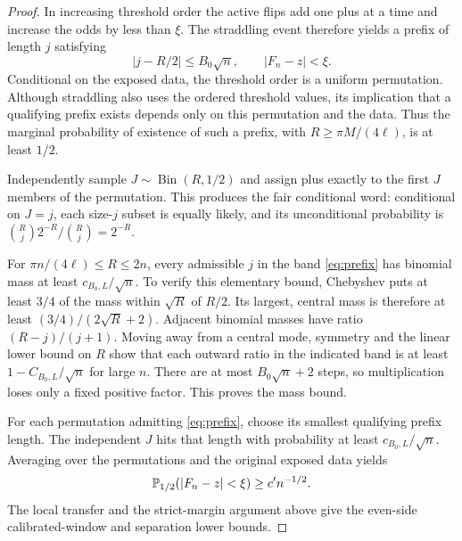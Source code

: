 \begin{proof}
In increasing threshold order the active flips add one plus at a time and increase the odds by less than $\xi$. The straddling event therefore yields a prefix of length $j$ satisfying
\begin{equation}\label{eq:prefix}
 |j-R/2|\le B_0\sqrt n,\qquad |F_n-z|<\xi.
\end{equation}
Conditional on the exposed data, the threshold order is a uniform permutation. Although straddling also uses the ordered threshold values, its implication that a qualifying prefix exists depends only on this permutation and the data. Thus the marginal probability of existence of such a prefix, with $R\ge\pi M/(4\ell)$, is at least $1/2$.

Independently sample $J\sim\operatorname{Bin}(R,1/2)$ and assign plus exactly to the first $J$ members of the permutation. This produces the fair conditional word: conditional on $J=j$, each size-$j$ subset is equally likely, and its unconditional probability is $\binom Rj2^{-R}/\binom Rj=2^{-R}$.

For $\pi n/(4\ell)\le R\le2n$, every admissible $j$ in the band \eqref{eq:prefix} has binomial mass at least $c_{B_0,L}/\sqrt n$. To verify this elementary bound, Chebyshev puts at least $3/4$ of the mass within $\sqrt R$ of $R/2$. Its largest, central mass is therefore at least $(3/4)/(2\sqrt R+2)$. Adjacent binomial masses have ratio $(R-j)/(j+1)$. Moving away from a central mode, symmetry and the linear lower bound on $R$ show that each outward ratio in the indicated band is at least $1-C_{B_0,L}/\sqrt n$ for large $n$. There are at most $B_0\sqrt n+2$ steps, so multiplication loses only a fixed positive factor. This proves the mass bound.

For each permutation admitting \eqref{eq:prefix}, choose its smallest qualifying prefix length. The independent $J$ hits that length with probability at least $c_{B_0,L}/\sqrt n$. Averaging over the permutations and the original exposed data yields
\[
 \mathbb P_{1/2}(|F_n-z|<\xi)\ge c' n^{-1/2}.
\]
The local transfer and the strict-margin argument above give the even-side calibrated-window and separation lower bounds.
\end{proof}

